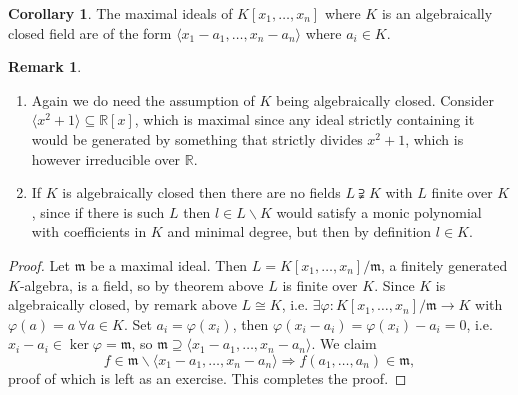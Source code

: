 \documentclass[a4paper]{article}
\newcommand{\la}{\langle}
\newcommand{\ra}{\rangle}
\newcommand{\m}{\mathfrak m}
\theoremstyle{definition}
\newtheorem{coro}[defn]{Corollary}
\newtheorem*{remark}{Remark}
\begin{document}
\begin{coro}
The maximal ideals of $K[x_1,\ldots,x_n]$ where $K$ is an algebraically closed field are of the form $\la x_1-a_1,\ldots,x_n-a_n\ra$ where $a_i\in K$.
\end{coro}
\begin{remark}
\begin{enumerate}
\item Again we do need the assumption of $K$ being algebraically closed. Consider $\la x^2+1\ra\subseteq \mathbb R[x]$, which is maximal since any ideal strictly containing it would be generated by something that strictly divides $x^2+1$, which is however irreducible over $\mathbb R$.
\item If $K$ is algebraically closed then there are no fields $L\supsetneqq K$ with $L$ finite over $K$, since if there is such $L$ then $l\in L\backslash K$ would satisfy a monic polynomial with coefficients in $K$ and minimal degree, but then by definition $l\in K$.
\end{enumerate}
\end{remark}
\begin{proof}
Let $\m$ be a maximal ideal. Then $L=K[x_1,\ldots,x_n]/\m$, a finitely generated $K$-algebra, is a field, so by theorem above $L$ is finite over $K$. Since $K$ is algebraically closed, by remark above $L\cong K$, i.e. $\exists\varphi:K[x_1,\ldots,x_n]/\m\rightarrow K$ with $\varphi(a)=a\ \forall a\in K$. Set $a_i=\varphi(x_i)$, then $\varphi(x_i-a_i)=\varphi(x_i)-a_i=0$, i.e. $x_i-a_i\in\ker\varphi=\m$, so $\m\supseteq\la x_1-a_1,\ldots,x_n-a_n\ra$. We claim
\[
f\in\m\backslash\la x_1-a_1,\ldots,x_n-a_n\ra \Rightarrow f(a_1,\ldots,a_n)\in\m,
\]
proof of which is left as an exercise. This completes the proof.
\end{proof}
\end{document}
